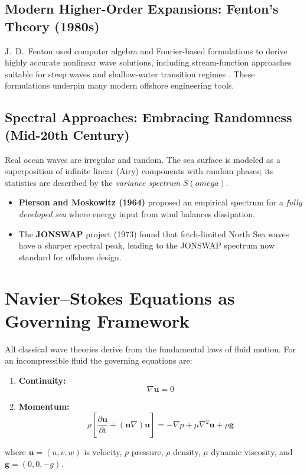 \documentclass[journal,10pt,twocolumn]{IEEEtran}
\def\omega{omega}%
\def\cdot{}%
\begin{document}
\subsection{Modern Higher-Order Expansions: Fenton's Theory (1980s)}
J.~D.~Fenton used computer algebra and Fourier-based formulations to derive highly
accurate nonlinear wave solutions, including stream-function approaches suitable for
steep waves and shallow-water transition regimes \cite{Fenton1990}.
These formulations underpin many modern offshore engineering tools.

\subsection{Spectral Approaches: Embracing Randomness (Mid-20th Century)}
Real ocean waves are irregular and random.
The sea surface is modeled as a superposition of infinite linear (Airy) components with
random phases; its statistics are described by the \emph{variance spectrum} $S(\omega)$.
\begin{itemize}
  \item \textbf{Pierson and Moskowitz (1964)} proposed an empirical spectrum for a
    \emph{fully developed sea} where energy input from wind balances dissipation.
  \item The \textbf{JONSWAP} project (1973) found that fetch-limited North Sea waves
    have a sharper spectral peak, leading to the JONSWAP spectrum now standard for
    offshore design.
\end{itemize}

\section{Navier--Stokes Equations as Governing Framework}
\label{sec:ns}

All classical wave theories derive from the fundamental laws of fluid motion.
For an incompressible fluid the governing equations are:
\begin{enumerate}
  \item \textbf{Continuity:}
    \begin{equation}
      \nabla \cdot \mathbf{u} = 0
      \label{eq:continuity}
    \end{equation}
  \item \textbf{Momentum:}
    \begin{equation}
      \rho \!\left[\frac{\partial \mathbf{u}}{\partial t}
        + (\mathbf{u} \cdot \nabla)\mathbf{u}\right]
        = -\nabla p + \mu\nabla^2\mathbf{u} + \rho\mathbf{g}
      \label{eq:navierstokes}
    \end{equation}
\end{enumerate}
where $\mathbf{u}=(u,v,w)$ is velocity, $p$ pressure, $\rho$ density, $\mu$ dynamic
viscosity, and $\mathbf{g}=(0,0,-g)$.
\end{document}
